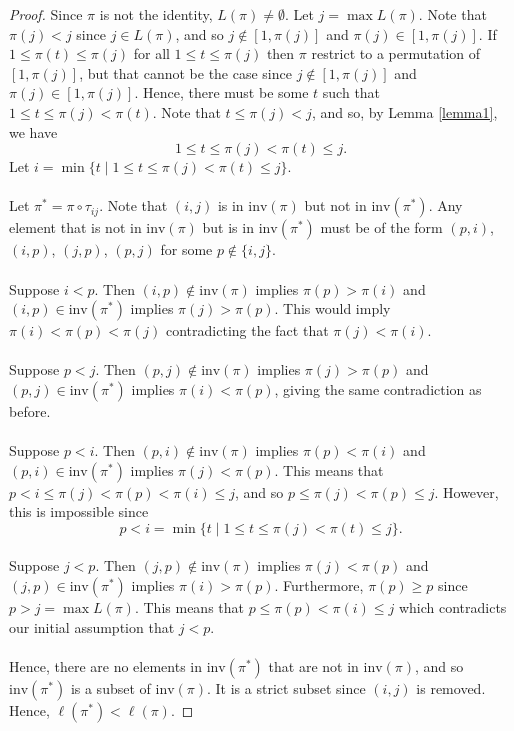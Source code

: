\documentclass[psamsfonts]{amsart}
\theoremstyle{definition}
\theoremstyle{remark}
\numberwithin{equation}{section}
\begin{document}
\begin{proof}
Since $\pi$ is not the identity, $L(\pi)\neq \emptyset$. Let $j=\max L(\pi)$.
Note that $\pi(j)<j$ since $j\in L(\pi)$, and so $j\notin [1,\pi(j)]$ and $\pi(j)\in [1,\pi(j)]$.
If $1\leq \pi(t)\leq\pi(j)$ for all $1\leq t\leq\pi(j)$ then $\pi$ restrict to a permutation of $[1,\pi(j)]$, but that cannot be the case since $j\notin [1,\pi(j)]$ and $\pi(j)\in[1,\pi(j)]$. Hence, there must be some $t$ such that $1\leq t \leq \pi(j)<\pi(t)$. Note that $t\leq \pi(j)<j$, and so, by Lemma \ref{lemma1}, we have 
\[1\leq t \leq \pi(j)<\pi(t)\leq j.\]
Let $i=\min\{t\mid 1\leq t \leq \pi(j)<\pi(t)\leq j\}$.
\\
\\
Let $\pi^*=\pi\circ\tau_{ij}$. Note that $(i,j)$ is in $\text{inv}(\pi)$ but not in $\text{inv}(\pi^*)$. Any element that is not in $\text{inv}(\pi)$ but is in $\text{inv}(\pi^*)$ must be of the form $(p,i)$, $(i,p)$, $(j,p)$, $(p,j)$ for some $p\notin \{i,j\}$. 
\\
\\
Suppose $i<p$. Then $(i,p)\notin \text{inv}(\pi)$ implies $\pi(p)>\pi(i)$ and $(i,p)\in \text{inv}(\pi^*)$ implies $\pi(j)>\pi(p)$. This would imply $\pi(i)<\pi(p)<\pi(j)$ contradicting the fact that $\pi(j)<\pi(i)$. 
\\
\\
Suppose $p<j$. Then $(p,j)\notin \text{inv}(\pi)$ implies $\pi(j)>\pi(p)$ and $(p,j)\in \text{inv}(\pi^*)$ implies $\pi(i)<\pi(p)$, giving the same contradiction as before.
\\
\\
Suppose $p<i$. Then $(p,i)\notin \text{inv}(\pi)$ implies $\pi(p)<\pi(i)$ and $(p,i)\in \text{inv}(\pi^*)$ implies $\pi(j)<\pi(p)$. This means that $p<i\leq \pi(j)<\pi(p)<\pi(i)\leq j$, and so $p\leq \pi(j)<\pi(p)\leq j$. However, this is impossible since $$p<i=\min\{t\mid 1\leq t \leq \pi(j)<\pi(t)\leq j\}.$$
\\
Suppose $j<p$. Then $(j,p)\notin \text{inv}(\pi)$ implies $\pi(j)<\pi(p)$ and $(j,p)\in \text{inv}(\pi^*)$ implies $\pi(i)>\pi(p)$. Furthermore, $\pi(p)\geq p$ since $p>j=\max L(\pi)$. This means that $p\leq \pi(p)<\pi(i)\leq j$ which contradicts our initial assumption that $j<p$.
\\
\\
Hence, there are no elements in $\text{inv}(\pi^*)$ that are not in $\text{inv}(\pi)$, and so $\text{inv}(\pi^*)$ is a subset of $\text{inv}(\pi)$. It is a strict subset since $(i,j)$ is removed. Hence, $\ell(\pi^*)<\ell(\pi)$.
\end{proof}
\end{document}
